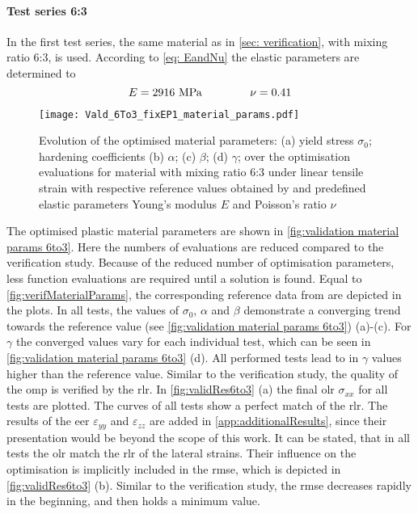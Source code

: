 \paragraph{Test series 6:3}
In the first test series, the same material as in \autoref{sec: verification}, with mixing ratio 6:3, is used. According to \autoref{eq: EandNu} the elastic parameters are determined to 
\begin{equation*}
    E = 2916 \text{MPa} \hspace{1.5cm} \nu = 0.41 
\end{equation*}

\begin{figure}[H]
    \centering
    \texttt{[image: Vald\_6To3\_fixEP1\_material\_params.pdf]}
    \caption{Evolution of the optimised material parameters: (a) yield stress $\sigma_0$; hardening coefficients (b) $\alpha$; (c) $\beta$; (d) $\gamma$; over the optimisation evaluations for material with mixing ratio 6:3 under linear tensile strain with respective reference values obtained by \citet{ries_deciphering_nodate} and predefined elastic parameters Young's modulus $E$ and Poisson's ratio $\nu$}
    \label{fig:validation material params 6to3}
\end{figure}

The optimised plastic material parameters are shown in \autoref{fig:validation material params 6to3}. Here the numbers of evaluations are reduced compared to the verification study. Because of the reduced number of optimisation parameters, less function evaluations are required until a solution is found.
Equal to \autoref{fig:verifMaterialParams}, the corresponding reference data from \citet{ries_deciphering_nodate} are depicted in the plots.
In all tests, the values of $\sigma_0$, $\alpha$ and $\beta$ demonstrate a converging trend towards the reference value (see \autoref{fig:validation material params 6to3}) (a)-(c).
For $\gamma$ the converged values vary for each individual test, which can be seen in \autoref{fig:validation material params 6to3} (d).
All performed tests lead to in $\gamma$ values higher than the reference value. Similar to the verification study, the quality of the \acrlong{omp} is verified by the \acrlong{rlr}.
In \autoref{fig:validRes6to3} (a) the final \acrlong{olr} $\sigma_{xx}$ for all tests are plotted. The curves of all tests show a perfect match of the \acrlong{rlr}. The results of the \acrlong{eer} $\varepsilon_{yy}$ and $\varepsilon_{zz}$ are added in \autoref{app:additionalResults}, since their presentation would be beyond the scope of this work. It can be stated, that in all tests the \acrlong{olr} match the \acrlong{rlr} of the lateral strains. Their influence on the optimisation is implicitly included in the \acrshort{rmse}, which is depicted in \autoref{fig:validRes6to3} (b). Similar to the verification study, the \acrshort{rmse} decreases rapidly in the beginning, and then holds a minimum value.


